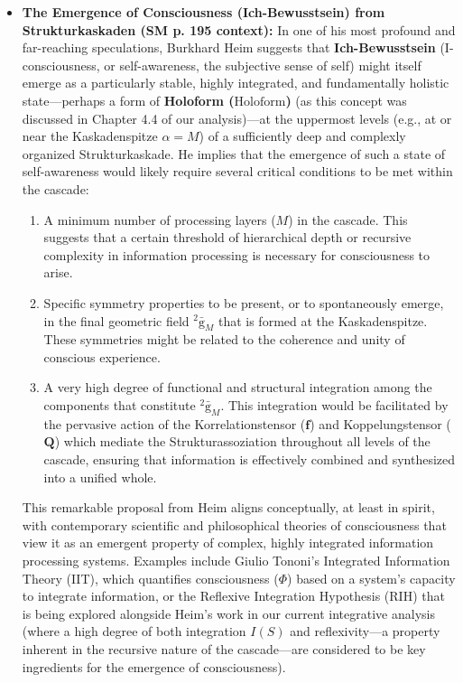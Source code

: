\documentclass[12pt]{article}
\newcommand{\holoform}{\text{Holoform}}
\newcommand{\kompositionsfeld}{{}^2\bar{\mathrm{g}}}
\newcommand{\korrelationstensor}{\mathbf{f}}
\newcommand{\koppelungstensor}{\mathbf{Q}}
\newcommand{\kaskadenstufe}{\alpha}
\begin{document}
\begin{itemize}
    \item \textbf{The Emergence of Consciousness (Ich-Bewusstsein) from Strukturkaskaden (SM p. 195 context):}
    In one of his most profound and far-reaching speculations, Burkhard Heim suggests that \textbf{Ich-Bewusstsein} (I-consciousness, or self-awareness, the subjective sense of self) might itself emerge as a particularly stable, highly integrated, and fundamentally holistic state—perhaps a form of \textbf{Holoform (\(\holoform\))} (as this concept was discussed in Chapter 4.4 of our analysis)—at the uppermost levels (e.g., at or near the Kaskadenspitze \( \kaskadenstufe=M \)) of a sufficiently deep and complexly organized Strukturkaskade. He implies that the emergence of such a state of self-awareness would likely require several critical conditions to be met within the cascade:
    \begin{enumerate}
        \item A minimum number of processing layers (\( M \)) in the cascade. This suggests that a certain threshold of hierarchical depth or recursive complexity in information processing is necessary for consciousness to arise.
        \item Specific symmetry properties to be present, or to spontaneously emerge, in the final geometric field \( \kompositionsfeld_M \) that is formed at the Kaskadenspitze. These symmetries might be related to the coherence and unity of conscious experience.
        \item A very high degree of functional and structural integration among the components that constitute \( \kompositionsfeld_M \). This integration would be facilitated by the pervasive action of the Korrelationstensor (\( \korrelationstensor \)) and Koppelungstensor (\( \koppelungstensor \)) which mediate the Strukturassoziation throughout all levels of the cascade, ensuring that information is effectively combined and synthesized into a unified whole.
    \end{enumerate}
    This remarkable proposal from Heim aligns conceptually, at least in spirit, with contemporary scientific and philosophical theories of consciousness that view it as an emergent property of complex, highly integrated information processing systems. Examples include Giulio Tononi's Integrated Information Theory (IIT), which quantifies consciousness (\( \Phi \)) based on a system's capacity to integrate information, or the Reflexive Integration Hypothesis (RIH) that is being explored alongside Heim's work in our current integrative analysis (where a high degree of both integration \( I(S) \) and reflexivity—a property inherent in the recursive nature of the cascade—are considered to be key ingredients for the emergence of consciousness).


\end{itemize}
\end{document}
